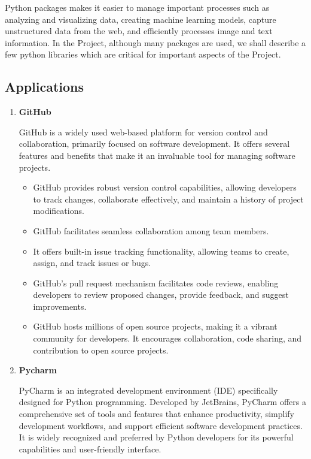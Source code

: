Python packages makes it easier to manage important processes such as analyzing and visualizing data, creating machine learning models, capture unstructured data from the web, and efficiently processes image and text information. In the Project, although many packages are used, we shall describe a few python libraries which are critical for important aspects of the Project.

\subsection{Applications}

	\begin{enumerate}
		
		\item \textbf{GitHub}
			
			GitHub is a widely used web-based platform for version control and collaboration, primarily focused on software development. It offers several features and benefits that make it an invaluable tool for managing software projects. 
			
			\begin{itemize}
				
				\item GitHub provides robust version control capabilities, allowing developers to track changes, collaborate effectively, and maintain a history of project modifications.
				
				\item GitHub facilitates seamless collaboration among team members.
				
				\item It offers built-in issue tracking functionality, allowing teams to create, assign, and track issues or bugs.
				
				\item GitHub's pull request mechanism facilitates code reviews, enabling developers to review proposed changes, provide feedback, and suggest improvements. 
				
				\item GitHub hosts millions of open source projects, making it a vibrant community for developers. It encourages collaboration, code sharing, and contribution to open source projects.
				
			\end{itemize}
			
		\item \textbf{Pycharm}
		
			PyCharm is an integrated development environment (IDE) specifically designed for Python programming. Developed by JetBrains, PyCharm offers a comprehensive set of tools and features that enhance productivity, simplify development workflows, and support efficient software development practices. It is widely recognized and preferred by Python developers for its powerful capabilities and user-friendly interface.
			

\end{enumerate}

